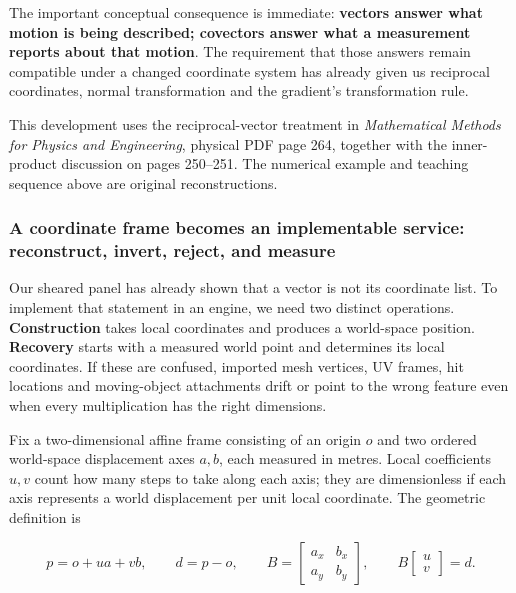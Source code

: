 The important conceptual consequence is immediate: \textbf{vectors answer what motion is being described; covectors answer what a measurement reports about that motion}. The requirement that those answers remain compatible under a changed coordinate system has already given us reciprocal coordinates, normal transformation and the gradient's transformation rule.

This development uses the reciprocal-vector treatment in \emph{Mathematical Methods for Physics and Engineering}, physical PDF page 264, together with the inner-product discussion on pages 250--251. The numerical example and teaching sequence above are original reconstructions.

\subsubsection{A coordinate frame becomes an implementable service: reconstruct, invert, reject, and measure}\label{01-foundations-i-ch017-a-coordinate-frame-becomes-an-implementable-service-reconstruct-invert-reject-and-measure}

\hypertarget{01-foundations-i-ch017-a-coordinate-frame-becomes-an-implementable-service-reconstruct-invert-reject-and-measure}{}

Our sheared panel has already shown that a vector is not its coordinate list. To implement that statement in an engine, we need two distinct operations. \textbf{Construction} takes local coordinates and produces a world-space position. \textbf{Recovery} starts with a measured world point and determines its local coordinates. If these are confused, imported mesh vertices, UV frames, hit locations and moving-object attachments drift or point to the wrong feature even when every multiplication has the right dimensions.

Fix a two-dimensional affine frame consisting of an origin \(o\) and two ordered world-space displacement axes \(a,b\), each measured in metres. Local coefficients \(u,v\) count how many steps to take along each axis; they are dimensionless if each axis represents a world displacement per unit local coordinate. The geometric definition is

\[
p=o+ua+vb,\qquad d=p-o,\qquad
B=\begin{bmatrix}a_x&b_x\\a_y&b_y\end{bmatrix},\qquad
B\begin{bmatrix}u\\v\end{bmatrix}=d.
\]

